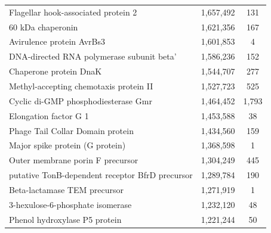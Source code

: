 \begin{singlespace}
\begin{longtable}{p{} cc}
                                                       Flagellar hook-associated protein 2 &                   1,657,492 &           131 \\
                                                                         60 kDa chaperonin &                   1,621,356 &           167 \\
                                                                 Avirulence protein AvrBs3 &                   1,601,853 &             4 \\
                                                 DNA-directed RNA polymerase subunit beta' &                   1,586,236 &           152 \\
                                                                    Chaperone protein DnaK &                   1,544,707 &           277 \\
                                                    Methyl-accepting chemotaxis protein II &                   1,527,723 &           525 \\
                                                       Cyclic di-GMP phosphodiesterase Gmr &                   1,464,452 &         1,793 \\
                                                                     Elongation factor G 1 &                   1,453,588 &            38 \\
                                                          Phage Tail Collar Domain protein &                   1,434,560 &           159 \\
                                                           Major spike protein (G protein) &                   1,368,598 &             1 \\
                                                          Outer membrane porin F precursor &                   1,304,249 &           445 \\
                                           putative TonB-dependent receptor BfrD precursor &                   1,289,784 &           190 \\
                                                              Beta-lactamase TEM precursor &                   1,271,919 &             1 \\
                                                          3-hexulose-6-phosphate isomerase &                   1,232,120 &            48 \\
                                                             Phenol hydroxylase P5 protein &                   1,221,244 &            50 \\

\end{longtable}
\end{singlespace}
